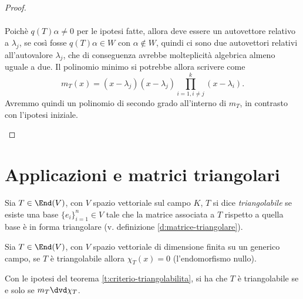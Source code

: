 \begin{proof}
\begin{itemize}
\begin{equation*}
\begin{aligned}
				\end{aligned}
			\end{equation*}
			Poichè $q(T)\alpha \neq 0$ per le ipotesi fatte, allora deve essere un autovettore relativo a $\lambda_j$, se così fosse $q(T)\alpha\in W$ con $\alpha\notin W$, quindi ci sono due autovettori relativi all'autovalore $\lambda_j$, che di conseguenza avrebbe molteplicità algebrica almeno uguale a due.
			Il polinomio minimo si potrebbe allora scrivere come
			\begin{equation*}
				m_T(x) = (x-\lambda_j)(x-\lambda_j) \prod\limits_{i=1 , i\neq j}^k(x-\lambda_i).
			\end{equation*}
			Avremmo quindi un polinomio di secondo grado all'interno di $m_T$, in contrasto con l'ipotesi iniziale.
	\end{itemize}
\end{proof}

\section{Applicazioni e matrici triangolari}
\begin{definizione} \label{d:endomorfismo-triangolabile}
	Sia $T\in \End(V)$, con $V$ spazio vettoriale sul campo $K$, $T$ si dice \emph{triangolabile} se esiste una base $\{e_i\}_{i=1}^n\in V$ tale che la matrice associata a $T$ rispetto a quella base è in forma triangolare (v. definizione \ref{d:matrice-triangolare}).
\end{definizione}
\begin{teorema} \label{t:criterio-triangolabilita}
	Sia $T\in \End(V)$, con $V$ spazio vettoriale di dimensione finita su un generico campo, se $T$ è triangolabile allora $\chi_T(x) = 0$ (l'endomorfismo nullo).
\end{teorema}
\begin{corollario}
	Con le ipotesi del teorema \ref{t:criterio-triangolabilita}, si ha che $T$ è triangolabile se e solo se $m_T\dvd\chi_T$.
\end{corollario}
